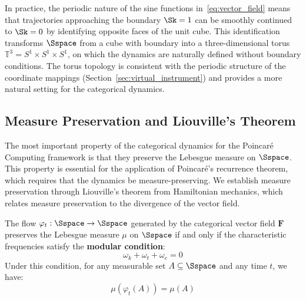 \begin{remark}
\label{rem:boundary_behavior}
In practice, the periodic nature of the sine functions in~\eqref{eq:vector_field} means that trajectories approaching the boundary $\Sk = 1$ can be smoothly continued to $\Sk = 0$ by identifying opposite faces of the unit cube. This identification transforms $\Sspace$ from a cube with boundary into a three-dimensional torus $\mathbb{T}^3 = S^1 \times S^1 \times S^1$, on which the dynamics are naturally defined without boundary conditions. The torus topology is consistent with the periodic structure of the coordinate mappings (Section~\ref{sec:virtual_instrument}) and provides a more natural setting for the categorical dynamics.
\end{remark}

\subsection{Measure Preservation and Liouville's Theorem}

The most important property of the categorical dynamics for the Poincaré Computing framework is that they preserve the Lebesgue measure on $\Sspace$. This property is essential for the application of Poincaré's recurrence theorem, which requires that the dynamics be measure-preserving. We establish measure preservation through Liouville's theorem from Hamiltonian mechanics, which relates measure preservation to the divergence of the vector field.

\begin{theorem}
\label{thm:measure_preservation}
The flow $\varphi_t: \Sspace \to \Sspace$ generated by the categorical vector field $\mathbf{F}$ preserves the Lebesgue measure $\mu$ on $\Sspace$ if and only if the characteristic frequencies satisfy the \textbf{modular condition}:
\begin{equation}
\omega_k + \omega_t + \omega_e = 0
\label{eq:modular_condition}
\end{equation}
Under this condition, for any measurable set $A \subseteq \Sspace$ and any time $t$, we have:
\begin{equation}
\mu(\varphi_t(A)) = \mu(A)
\label{eq:measure_preservation}
\end{equation}
\end{theorem}

